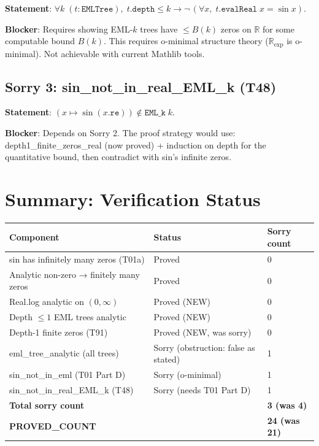 \documentclass[12pt]{article}
\theoremstyle{definition}
\begin{document}
\textbf{Statement}: $\forall k\;(t : \texttt{EMLTree}),\; t.\texttt{depth} \leq k \to
  \neg\,(\forall x,\; t.\texttt{evalReal}\;x = \sin x)$.

\textbf{Blocker}: Requires showing EML-$k$ trees have $\leq B(k)$ zeros on $\mathbb{R}$
for some computable bound $B(k)$.  This requires o-minimal structure theory
($\mathbb{R}_{\exp}$ is o-minimal).  Not achievable with current Mathlib tools.

\subsection{Sorry 3: sin\_not\_in\_real\_EML\_k (T48)}

\textbf{Statement}: $(x \mapsto \sin(x.\texttt{re})) \notin \texttt{EML\_k}\;k$.

\textbf{Blocker}: Depends on Sorry 2.  The proof strategy would use:
depth1\_finite\_zeros\_real (now proved) + induction on depth for the quantitative bound,
then contradict with sin's infinite zeros.

\section{Summary: Verification Status}

\begin{center}
\begin{tabular}{lll}
\toprule
Component & Status & Sorry count \\
\midrule
sin has infinitely many zeros (T01a) & \textcolor{proved}{Proved} & 0 \\
Analytic non-zero → finitely many zeros & \textcolor{proved}{Proved} & 0 \\
Real.log analytic on $(0,\infty)$ & \textcolor{proved}{Proved (NEW)} & 0 \\
Depth $\leq 1$ EML trees analytic & \textcolor{proved}{Proved (NEW)} & 0 \\
Depth-1 finite zeros (T91) & \textcolor{proved}{Proved (NEW, was sorry)} & 0 \\
\midrule
eml\_tree\_analytic (all trees) & \textcolor{sorry}{Sorry (obstruction: false as stated)} & 1 \\
sin\_not\_in\_eml (T01 Part D) & \textcolor{sorry}{Sorry (o-minimal)} & 1 \\
sin\_not\_in\_real\_EML\_k (T48) & \textcolor{sorry}{Sorry (needs T01 Part D)} & 1 \\
\midrule
\textbf{Total sorry count} & & \textbf{3 (was 4)} \\
\textbf{PROVED\_COUNT} & & \textbf{24 (was 21)} \\
\bottomrule
\end{tabular}
\end{center}
\end{document}
